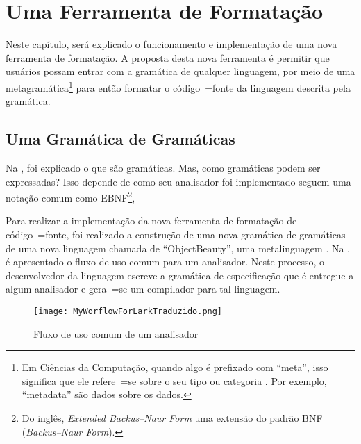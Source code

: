 

\chapter{Uma Ferramenta de Formatação}
\label{software_implementation}

Neste capítulo,
será explicado o funcionamento e
implementação de uma nova ferramenta de formatação.
A proposta desta nova ferramenta é permitir que usuários possam entrar com a gramática de qualquer linguagem,
por meio de uma metagramática\footnote{
Em Ciências da Computação,
quando algo é prefixado com ``meta'',
isso significa que ele refere~=se sobre o seu tipo ou
categoria \cite{theUseOfMetaRules}.
Por exemplo,
``metadata'' são dados sobre os dados.
} para então formatar o código~=fonte da linguagem descrita pela gramática.


\section{Uma Gramática de Gramáticas}
\label{GrammarsGrammar}

Na ,
foi explicado o que são gramáticas.
Mas,
como gramáticas podem ser expressadas?
Isso depende de como seu analisador foi implementado  seguem uma notação comum como EBNF\footnote{
Do inglês,
\textit{Extended Backus–Naur Form} uma extensão do padrão BNF (\textit{Backus–Naur Form}).
}\cite{teachingEbnf,antlrBookTerrentParr},

Para realizar a implementação da nova ferramenta de formatação de código~=fonte,
foi realizado a construção de uma nova gramática de gramáticas de uma nova linguagem chamada de ``ObjectBeauty'',
uma metalinguagem \cite{compilersCompilerMetaLanguage}.
Na ,
é apresentado o fluxo de uso comum para um analisador.
Neste processo,
o desenvolvedor da linguagem escreve a gramática de especificação que é entregue a algum analisador e
gera~=se um compilador para tal linguagem.
\begin{figure}[!htb]
\caption{Fluxo de uso comum de um analisador}
\label{MyWorflowForLarkTraduzido}
\centering
\texttt{[image: MyWorflowForLarkTraduzido.png]}
\end{figure}

